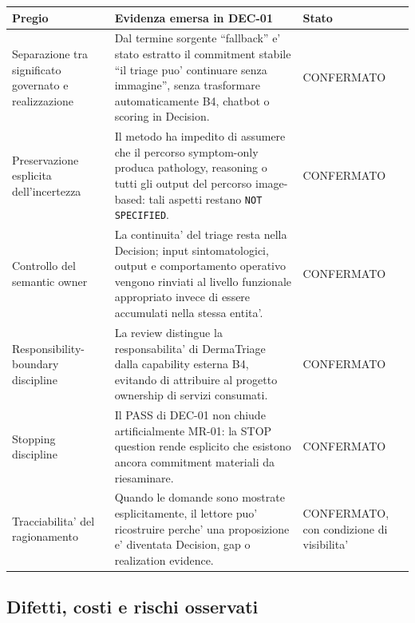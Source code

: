 \documentclass[11pt,a4paper]{article}
\begin{document}
\begin{tabularx}{\textwidth}{L{42mm}Y L{25mm}}
\toprule
\textbf{Pregio} & \textbf{Evidenza emersa in DEC-01} & \textbf{Stato} \\
\midrule
Separazione tra significato governato e realizzazione & Dal termine sorgente ``fallback'' e' stato estratto il commitment stabile ``il triage puo' continuare senza immagine'', senza trasformare automaticamente B4, chatbot o scoring in Decision. & CONFERMATO \\
Preservazione esplicita dell'incertezza & Il metodo ha impedito di assumere che il percorso symptom-only produca pathology, reasoning o tutti gli output del percorso image-based: tali aspetti restano \texttt{NOT SPECIFIED}. & CONFERMATO \\
Controllo del semantic owner & La continuita' del triage resta nella Decision; input sintomatologici, output e comportamento operativo vengono rinviati al livello funzionale appropriato invece di essere accumulati nella stessa entita'. & CONFERMATO \\
Responsibility-boundary discipline & La review distingue la responsabilita' di DermaTriage dalla capability esterna B4, evitando di attribuire al progetto ownership di servizi consumati. & CONFERMATO \\
Stopping discipline & Il PASS di DEC-01 non chiude artificialmente MR-01: la STOP question rende esplicito che esistono ancora commitment materiali da riesaminare. & CONFERMATO \\
Tracciabilita' del ragionamento & Quando le domande sono mostrate esplicitamente, il lettore puo' ricostruire perche' una proposizione e' diventata Decision, gap o realization evidence. & CONFERMATO, con condizione di visibilita' \\
\bottomrule
\end{tabularx}

\subsection{Difetti, costi e rischi osservati}
\end{document}
